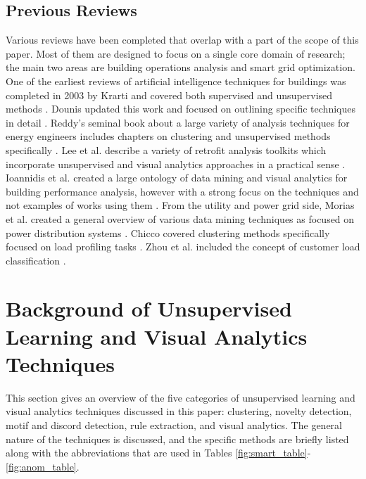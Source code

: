 \documentclass[preprint,12pt,3p]{elsarticle}
\begin{document}
\subsection{Previous Reviews}
Various reviews have been completed that overlap with a part of the scope of this paper. Most of them are designed to focus on a single core domain of research; the main two areas are building operations analysis and smart grid optimization. One of the earliest reviews of artificial intelligence techniques for buildings was completed in 2003 by Krarti and covered both supervised and unsupervised methods \cite{krarti_overview_2003}. Dounis updated this work and focused on outlining specific techniques in detail \cite{dounis_artificial_2010}.  Reddy's seminal book about a large variety of analysis techniques for energy engineers includes chapters on clustering and unsupervised methods specifically \cite{reddy_applied_2011}. Lee et al. describe a variety of retrofit analysis toolkits which incorporate unsupervised and visual analytics approaches in a practical sense \cite{lee_energy_2015}. Ioannidis et al. created a large ontology of data mining and visual analytics for building performance analysis, however with a strong focus on the techniques and not examples of works using them \cite{ioannidis_big_2015}. From the utility and power grid side, Morias et al. created a general overview of various data mining techniques as focused on power distribution systems \cite{morais_overview_2009}. Chicco covered clustering methods specifically focused on load profiling tasks \cite{chicco_overview_2012}. Zhou et al. included the concept of customer load classification  \cite{zhou_review_2013}.\\


\section{Background of Unsupervised Learning and Visual Analytics Techniques}
\label{Techniques}
This section gives an overview of the five categories of unsupervised learning and visual analytics techniques discussed in this paper: clustering, novelty detection, motif and discord detection, rule extraction, and visual analytics. The general nature of the techniques is discussed, and the specific methods are briefly listed along with the abbreviations that are used in Tables \ref{fig:smart_table}-\ref{fig:anom_table}.
\end{document}
